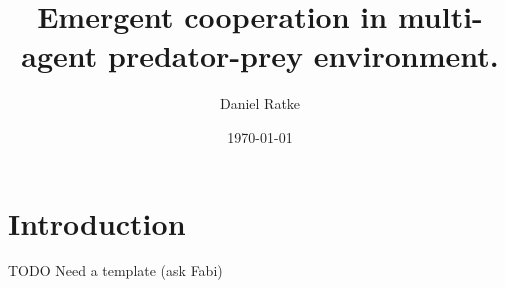 \documentclass[12pt, letterpaper, fleqn, notitlepage]{article}
\title{Emergent cooperation in multi-agent predator-prey environment.}
\date{\today}
\author{Daniel Ratke}
\begin{document}
\maketitle

\section{Introduction}

TODO Need a template (ask Fabi)



\end{document}
